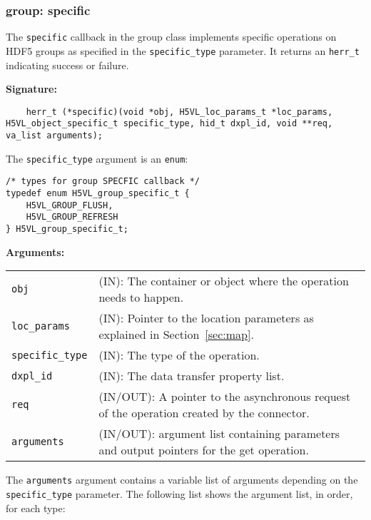\subsubsection{group: specific}
The \texttt{specific} callback in the group class implements specific operations on HDF5 groups as specified in the \texttt{specific\_type} parameter. It returns an \texttt{herr\_t} indicating success or failure.\bigskip

\begin{mdframed}[style=bgbox]
\textbf{Signature:}
\begin{lstlisting}
	herr_t (*specific)(void *obj, H5VL_loc_params_t *loc_params, H5VL_object_specific_t specific_type, hid_t dxpl_id, void **req, va_list arguments);
\end{lstlisting}

The \texttt{specific\_type} argument is an \texttt{enum}:
\begin{lstlisting}
/* types for group SPECFIC callback */                                           
typedef enum H5VL_group_specific_t {                                             
    H5VL_GROUP_FLUSH,                                                            
    H5VL_GROUP_REFRESH                                                           
} H5VL_group_specific_t;
\end{lstlisting}

\textbf{Arguments:}\\
\begin{tabular}{l p{13.5cm}}
  \texttt{obj} & (IN): The container or object where the operation needs to happen.\\
  \texttt{loc\_params} & (IN): Pointer to the location parameters as explained in Section~\ref{sec:map}.\\
  \texttt{specific\_type} & (IN): The type of the operation.\\
  \texttt{dxpl\_id} & (IN): The data transfer property list.\\
  \texttt{req} & (IN/OUT): A pointer to the asynchronous request of the
  operation created by the connector.\\
  \texttt{arguments} & (IN/OUT): argument list containing parameters and
  output pointers for the get operation. \\
\end{tabular}
\end{mdframed}

The \texttt{arguments} argument contains a variable list of arguments
depending on the \texttt{specific\_type} parameter. The following list shows
the argument list, in order, for each type:

